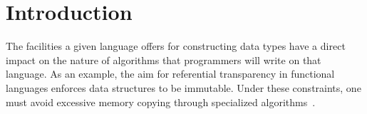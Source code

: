 \documentclass{sig-alternate}
\begin{document}



\section{Introduction}

The facilities a given language offers for constructing data types have a 
direct impact on the nature of algorithms that programmers will write on that 
language.
As an example, the aim for referential transparency in functional languages 
enforces data structures to be immutable.
Under these constraints, one must avoid excessive memory copying through 
specialized algorithms~\cite{okasaki.purely}.
\end{document}
